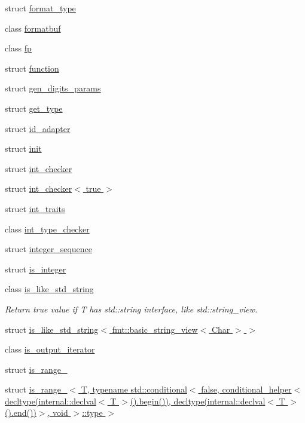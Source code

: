 \begin{DoxyCompactItemize}
struct \hyperlink{structinternal_1_1format__type}{format\+\_\+type}
\item 
class \hyperlink{classinternal_1_1formatbuf}{formatbuf}
\item 
class \hyperlink{classinternal_1_1fp}{fp}
\item 
struct \hyperlink{structinternal_1_1function}{function}
\item 
struct \hyperlink{structinternal_1_1gen__digits__params}{gen\+\_\+digits\+\_\+params}
\item 
struct \hyperlink{structinternal_1_1get__type}{get\+\_\+type}
\item 
struct \hyperlink{structinternal_1_1id__adapter}{id\+\_\+adapter}
\item 
struct \hyperlink{structinternal_1_1init}{init}
\item 
struct \hyperlink{structinternal_1_1int__checker}{int\+\_\+checker}
\item 
struct \hyperlink{structinternal_1_1int__checker_3_01true_01_4}{int\+\_\+checker$<$ true $>$}
\item 
struct \hyperlink{structinternal_1_1int__traits}{int\+\_\+traits}
\item 
class \hyperlink{classinternal_1_1int__type__checker}{int\+\_\+type\+\_\+checker}
\item 
struct \hyperlink{structinternal_1_1integer__sequence}{integer\+\_\+sequence}
\item 
struct \hyperlink{structinternal_1_1is__integer}{is\+\_\+integer}
\item 
class \hyperlink{classinternal_1_1is__like__std__string}{is\+\_\+like\+\_\+std\+\_\+string}
\begin{DoxyCompactList}\small\item\em Return true value if T has std\+::string interface, like std\+::string\+\_\+view. \end{DoxyCompactList}\item 
struct \hyperlink{structinternal_1_1is__like__std__string_3_01fmt_1_1basic__string__view_3_01_char_01_4_01_4}{is\+\_\+like\+\_\+std\+\_\+string$<$ fmt\+::basic\+\_\+string\+\_\+view$<$ Char $>$ $>$}
\item 
class \hyperlink{classinternal_1_1is__output__iterator}{is\+\_\+output\+\_\+iterator}
\item 
struct \hyperlink{structinternal_1_1is__range__}{is\+\_\+range\+\_\+}
\item 
struct \hyperlink{structinternal_1_1is__range___3_01_t_00_01typename_01std_1_1conditional_3_01false_00_01condition3cb3b849b8281fb701deab896849f46a}{is\+\_\+range\+\_\+$<$ T, typename std\+::conditional$<$ false, conditional\+\_\+helper$<$ decltype(internal\+::declval$<$ T $>$().\+begin()), decltype(internal\+::declval$<$ T $>$().\+end())$>$, void $>$\+::type $>$}

\end{DoxyCompactItemize}
